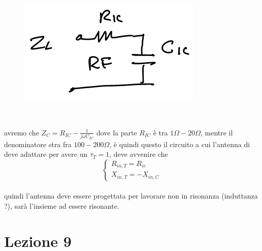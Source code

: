 \documentclass[oneside, 12pt]{extbook}
\begin{document}
\begin{figure}[!h]
	\includegraphics[scale=0.3]{immagini/parte_imm.png}
\end{figure}\\\\avremo che $Z_C = R_{IC} - \frac{1}{j \omega C_{IC}}$ dove la parte $R_{IC}$ è tra $1 \Omega - 20 \Omega$, mentre il denominatore stra fra $100 - 200 \Omega$, è quindi questo il circuito a cui l'antenna di deve adattare per avere un $\tau_T = 1$, deve avvenire che\\ 
\[
	\begin{cases}
	R_{in,T} = R_{ic}\\
	X_{in,T} = -X_{in,C}	
	\end{cases}
\]
\\quindi l'antenna deve essere progettata per lavorare non in risonanza (induttanza ?), sarà l'insieme ad essere risonante.

\chapter{Lezione 9}
\end{document}
